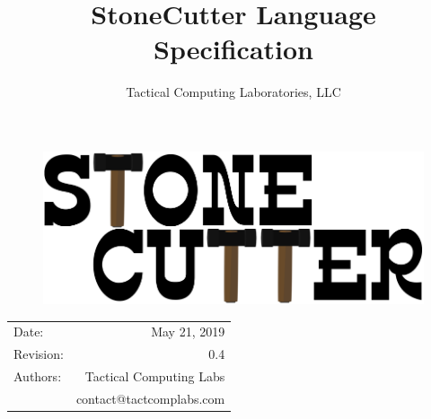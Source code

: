 \documentclass{article}
\title{StoneCutter Language\\Specification} %
\author{Tactical Computing Laboratories, LLC} %
\date{} %
\begin{document}
\begin{figure}
\begin{center}
\includegraphics[width=5in]{figures/stonecutter.png} %
\end{center}
\end{figure}

\maketitle %
\thispagestyle{fancy} %

\begin{center}
\begin{tabular}{l r}
Date: & May 21, 2019 \\ %
Revision: & 0.4 \\         %
Authors: & Tactical Computing Labs\\ %
& contact@tactcomplabs.com\\
\end{tabular}
\end{center}



\clearpage
\tableofcontents
\clearpage


\clearpage
\listoffigures
\lstlistoflistings
\listoftables
\clearpage
\end{document}
